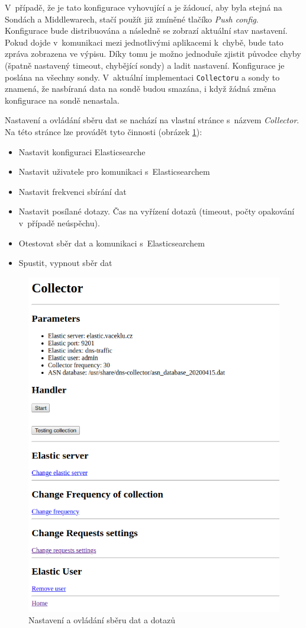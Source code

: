\documentclass[thesis=M,czech]{src/FITthesis}[2019/12/23]
\begin{document}
V~případě, že je tato konfigurace vyhovující a je žádoucí, aby byla stejná na Sondách a Middlewarech, stačí použít již zmíněné tlačíko \textit{Push config}. Konfigurace bude distribuována a následně se zobrazí aktuální stav nastavení. Pokud dojde v~komunikaci mezi jednotlivými aplikacemi k~chybě, bude tato zpráva zobrazena ve výpisu. Díky tomu je možno jednoduše zjistit původce chyby (špatně nastavený timeout, chybějící sondy) a ladit nastavení. Konfigurace je poslána na všechny sondy. V~aktuální implementaci \texttt{Collectoru} a sondy to znamená, že nasbíraná data na sondě budou smazána, i když žádná změna konfigurace na sondě nenastala. 

Nastavení a ovládání sběru dat se nachází na vlastní stránce s~názvem \textit{Collector}. Na této stránce lze provádět tyto činnosti (obrázek \ref{fig:collector_collector}):
\begin{itemize}
	\item Nastavit konfiguraci Elasticsearche
	\item Nastavit uživatele pro komunikaci s~Elasticsearchem
	\item Nastavit frekvenci sbírání dat
	\item Nastavit posílané dotazy. Čas na vyřízení dotazů (timeout, počty opakování v~případě neúspěchu).
	\item Otestovat sběr dat a komunikaci s~Elasticsearchem
	\item Spustit, vypnout sběr dat

\end{itemize}

\begin{figure}[ht]
  \centering
   \includegraphics[height=0.7\textwidth]{images/collector_collector.png}
   \caption{Nastavení a ovládání sběru dat a dotazů}
     \label{fig:collector_collector}
\end{figure}
\end{document}
